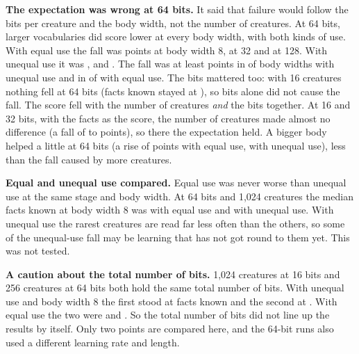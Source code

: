 \textbf{The expectation was wrong at 64 bits.} It said that failure would follow the bits per
creature and the body width, not the number of creatures. At 64 bits, larger vocabularies did score
lower at every body width, with both kinds of use. With equal use the fall was 
points at body width 8,  at 32 and
 at 128. With unequal use it was ,
 and . The fall was at least
 points in  of  body
widths with unequal use and in  of  with equal use. The bits mattered too: with
16 creatures nothing fell at 64 bits (facts known stayed at ), so
bits alone did not cause the fall. The score fell with the number of creatures \emph{and} the
bits together. At 16 and 32 bits, with the facts as the score, the number of creatures made almost no
difference (a fall of  to  points),
so there the expectation held. A bigger body helped a little at 64 bits (a rise of
 points with equal use,  with unequal use),
less than the fall caused by more creatures.

\textbf{Equal and unequal use compared.} Equal use was never worse than unequal use at the same
stage and body width. At 64 bits and 1,024 creatures the median facts known at body width 8 was
 with equal use and  with unequal
use. With unequal use the rarest creatures are read far less often than the others, so some of the
unequal-use fall may be learning that has not got round to them yet. This was not tested.

\textbf{A caution about the total number of bits.} 1,024 creatures at 16 bits and 256 creatures at
64 bits both hold the same total number of bits. With unequal use and body width 8 the first stood at
 facts known and the second at . With
equal use the two were  and . So
the total number of bits did not line up the results by itself. Only two points are compared here, and the
64-bit runs also used a different learning rate and length.
